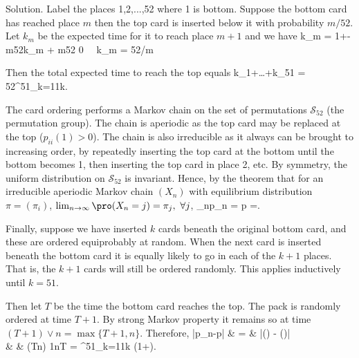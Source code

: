 
Solution. Label the places 1,2,...,52 where 1 is bottom. Suppose the bottom card has reached place $m$ then the top card is inserted below it with probability $m/52$. Let $k_m$ be the expected time for it to reach place $m+1$ and we have
\be
k_m = 1+-\frac m{52}\rob k_m + \frac m{52} 0 \ \ra \ k_m = 52/m
\ee

Then the total expected time to reach the top equals 
\be
k_1+\dots+k_{51} = 52\sum^{51}_{k=1}\frac 1k.
\ee

The card ordering performs a Markov chain on the set of permutations $\mathcal{S}_{52}$ (the permutation group). The chain is aperiodic as the top card may be replaced at the top ($p_{ii}{(1)}>0$). The chain is also irreducible as it always can be brought to increasing order, by repeatedly inserting the top card at the bottom until the bottom becomes 1, then inserting the top card in place 2, etc. By symmetry, the uniform distribution on $\mathcal{S}_{52}$ is invariant. Hence, by the theorem that for an irreducible aperiodic Markov chain $(X_n)$ with equilibrium distribution $\pi=(\pi_i)$, $\lim_{n\to\infty}\pro(X_n=j)=\pi_j, \ \forall j$,
\be
\lim_{n\to\infty}p_n = p =.
\ee 

Finally, suppose we have inserted $k$ cards beneath the original bottom card, and these are ordered equiprobably at random. When the next card is inserted beneath the bottom card it is equally likely to go in each of the $k+1$ places. That is, the $k+1$ cards will still be ordered randomly. This applies inductively until $k=51$.

Then let $T$ be the time the bottom card reaches the top. The pack is randomly ordered at time $T+1$. By strong Markov property it remains so at time $(T+1)\lor n = \max\{T+1,n\}$. Therefore,
\bea
|p_n-p| & = & |\pro() - \pro()|\nonumber\\
& \leq & \pro(T\geq n) \leq \frac 1n\E T = \sum^{51}_{k=1}\frac 1k \leq {}(1+).
\eea

\vspace{2mm}

\qcutline


